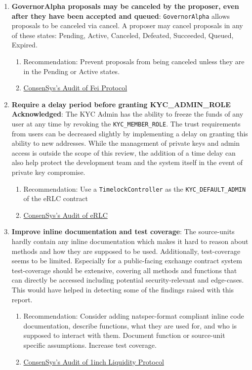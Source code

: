 \begin{enumerate}
\item\textbf{GovernorAlpha proposals may be canceled by the proposer, even after they have been accepted and queued}: \verb|GovernorAlpha| allows proposals to be canceled via cancel. A proposer may cancel proposals in any of these states: Pending, Active, Canceled, Defeated, Succeeded, Queued, Expired.
	\begin{enumerate}
	\item Recommendation: Prevent proposals from being canceled unless they are in the Pending or Active states.
	\item\href{https://consensys.net/diligence/audits/2021/01/fei-protocol/\#governoralpha-proposals-may-be-canceled-by-the-proposer-even-after-they-have-been-accepted-and-queued}{ConsenSys's Audit of Fei Protocol}
	\end{enumerate}

\item\textbf{Require a delay period before granting KYC\_ADMIN\_ROLE Acknowledged}: The KYC Admin has the ability to freeze the funds of any user at any time by revoking the \verb|KYC_MEMBER_ROLE|. The trust requirements from users can be decreased slightly by implementing a delay on granting this ability to new addresses. While the management of private keys and admin access is outside the scope of this review, the addition of a time delay can also help protect the development team and the system itself in the event of private key compromise.
	\begin{enumerate}
	\item Recommendation: Use a \verb|TimelockController| as the \verb|KYC_DEFAULT_ADMIN| of the eRLC contract
	\item\href{https://consensys.net/diligence/audits/2021/01/erlc-iexec/\#erlc-require-a-delay-period-before-granting-kyc-admin-role}{ConsenSys's Audit of eRLC}
	\end{enumerate}

\item\textbf{Improve inline documentation and test coverage}: The source-units hardly contain any inline documentation which makes it hard to reason about methods and how they are supposed to be used. Additionally, test-coverage seems to be limited. Especially for a public-facing exchange contract system test-coverage should be extensive, covering all methods and functions that can directly be accessed including potential security-relevant and edge-cases. This would have helped in detecting some of the findings raised with this report.
	\begin{enumerate}
	\item Recommendation: Consider adding natspec-format compliant inline code documentation, describe functions, what they are used for, and who is supposed to interact with them. Document function or source-unit specific assumptions. Increase test coverage.
	\item\href{https://consensys.net/diligence/audits/2020/12/1inch-liquidity-protocol/\#improve-inline-documentation-and-test-coverage}{ConsenSys's Audit of 1inch Liquidity Protocol}
	\end{enumerate}


\end{enumerate}

